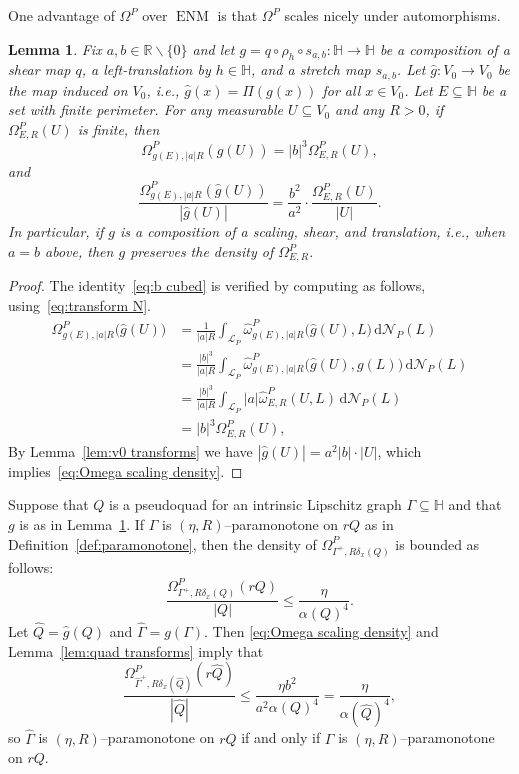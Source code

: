 \documentclass[11pt,reqno]{amsart}
\newcommand{\wwidehat}[1]{\widehat{#1}}
\renewcommand{\H}{\mathbb{H}}
\newcommand{\R}{\mathbb{R}}
\newcommand{\cL}{\mathcal{L}}
\newcommand{\cN}{\mathcal{N}}
\newcommand{\ud}[0]{\,\mathrm{d}}
\newcommand{\0}{\mathbf{0}}
\renewcommand{\1}{\mathbf 1}
\newcommand{\from}{\colon}
\renewcommand{\subset}{\subseteq}
\renewcommand{\le}{\leqslant}
\renewcommand{\setminus}{\smallsetminus}
\newtheorem{lemma}[thm]{Lemma}
\theoremstyle{remark}
\DeclareMathOperator{\ENM}{ENM}
\begin{document}
One advantage of $\Omega^P$ over $\ENM$ is that $\Omega^P$ scales nicely under automorphisms.

\begin{lemma}\label{lem:Omega scaling}
  Fix $a,b\in \R\setminus \{0\}$ and let $g=q\circ \rho_h\circ s_{a,b}\from \H\to \H$  be a composition of a shear map $q$, a left-translation by $h\in \H$, and a stretch map $s_{a,b}$.  Let $\hat{g}\from V_0\to V_0$ be the map induced on $V_0$, i.e., $\hat{g}(x)=\Pi(g(x))$ for all $x\in V_0$.  Let $E\subset \H$ be a set with finite perimeter.  For any measurable $U\subset V_0$ and any $R>0$, if $\Omega^P_{E, R}(U)$ is finite, then
  \begin{equation}\label{eq:b cubed}\Omega^P_{g(E), |a|R}(\hat{g}(U))=|b|^3\Omega^P_{E, R}(U),\end{equation}
  and
  \begin{equation}\label{eq:Omega scaling density}
    \frac{\Omega^P_{g(E), |a|R}(\hat{g}(U))}{|\hat{g}(U)|}=\frac{b^2}{a^2} \cdot \frac{\Omega^P_{E, R}(U)}{|U|}.
  \end{equation}
  In particular, if $g$ is a composition of a scaling, shear, and translation, i.e., when $a=b$ above,  then $g$ preserves the density of $\Omega^P_{E, R}$.
\end{lemma}
\begin{proof} The identity~\eqref{eq:b cubed} is verified by computing as follows, using~\eqref{eq:transform N}.
  \begin{align*}
    \Omega^P_{g(E), |a|R}\big(\hat{g}(U)\big)
    &=\frac{1}{|a|R} \int_{\cL_P} \wwidehat{\omega}^P_{g(E),|a| R}\big(\hat{g}(U),L\big)\ud \cN_P(L)\\
    &=\frac{|b|^3}{|a|R}\int_{\cL_P} \wwidehat{\omega}^P_{g(E),|a| R}\big(\hat{g}(U),g(L)\big)\ud \cN_P(L)\\
    &=\frac{|b|^3}{|a|R} \int_{\cL_P} |a| \wwidehat{\omega}^P_{E, R}(U,L)\ud \cN_P(L)\\
    &=|b|^3 \Omega^P_{E, R}(U),
  \end{align*}
 By Lemma~\ref{lem:v0 transforms} we have $|\hat{g}(U)|=a^2|b|\cdot  |U|$, which implies~\eqref{eq:Omega scaling density}.
\end{proof}

Suppose that $Q$ is a pseudoquad for an intrinsic Lipschitz graph $\Gamma\subset \H$ and that $g$ is as in Lemma~\ref{lem:Omega scaling}.  If $\Gamma$ is $(\eta,R)$--paramonotone on $rQ$ as in Definition~\ref{def:paramonotone}, then the density of $\Omega^P_{\Gamma^+,R\delta_x(Q)}$ is bounded as follows:
$$\frac{\Omega^P_{\Gamma^+,R\delta_x(Q)}(r Q)}{|Q|} \le \frac{\eta}{ \alpha(Q)^{4}}.$$
Let $\hat{Q}=\hat{g}(Q)$ and $\hat{\Gamma}=g(\Gamma)$.  Then \eqref{eq:Omega scaling density} and Lemma~\ref{lem:quad transforms} imply that
$$\frac{\Omega^P_{\hat{\Gamma}^+,R\delta_x(\hat{Q})}(r \hat{Q})}{|\hat{Q}|} \le \frac{\eta b^2}{a^{2}\alpha(Q)^{4}} = \frac{\eta}{ \alpha(\hat{Q})^{4}},$$
so $\hat{\Gamma}$ is $(\eta,R)$--paramonotone on $r\hat{Q}$ if and only if $\Gamma$ is $(\eta,R)$--paramonotone on $rQ$.
\end{document}
